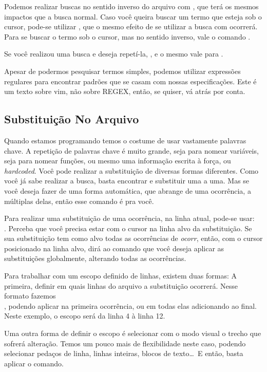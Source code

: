 \documentclass[a4paper, 12pt]{article}
\begin{document}
Podemos realizar buscas no sentido inverso do arquivo com , que terá os mesmos impactos que a busca normal.
Caso você queira buscar um termo que esteja sob o cursor, pode-se utilizar \vimcommand{\#},
que o mesmo efeito de se utilizar a busca com \vimcommand{/} ocorrerá. 
Para se buscar o termo sob o cursor, mas no sentido inverso, vale o comando \vimcommand{*}.

Se você realizou uma busca e deseja repetí-la, \vimcommand{//}, e o mesmo vale para .

Apesar de podermos pesquisar termos simples, podemos utilizar expressões regulares para encontrar padrões que se casam com nossas especificações.
Este é um texto sobre vim, não sobre REGEX, então, se quiser, vá atrás por conta.

\subsection{Substituição No Arquivo}
Quando estamos programando temos o costume de usar vastamente palavras chave.
A repetição de palavras chave é muito grande, seja para nomear variáveis, seja para nomear funções,
ou mesmo uma informação escrita à força, ou \textit{hardcoded}.
Você pode realizar a substituição de diversas formas diferentes.
Como você já sabe realizar a busca, basta encontrar e substituir uma a uma.
Mas se você deseja fazer de uma forma automática, que abrange de uma ocorrência, a múltiplas delas, então esse comando é pra você.

Para realizar uma substituição de uma ocorrência, na linha atual, pode-se usar:\\
.
Perceba que você precisa estar com o cursor na linha alvo da substituição.
Se sua substituição tem como alvo todas as ocorrências de \textit{ocorr}, então,
com o cursor posicionado na linha alvo,  dirá ao comando que
você deseja aplicar as substituições globalmente, alterando todas as ocorrências.

Para trabalhar com um escopo definido de linhas, existem duas formas: A primeira,
definir em quais linhas do arquivo a substituição ocorrerá.
Nesse formato fazemos \\
,
podendo aplicar na primeira ocorrência, ou em todas elas adicionando  ao final.
Neste exemplo, o escopo será da linha 4 à linha 12.

Uma outra forma de definir o escopo é selecionar com o modo visual o trecho
que sofrerá alteração.
Temos um pouco mais de flexibilidade neste caso, podendo selecionar pedaços de linha,
linhas inteiras,
blocos de texto\ldots\
E então, basta aplicar o comando.
\end{document}
